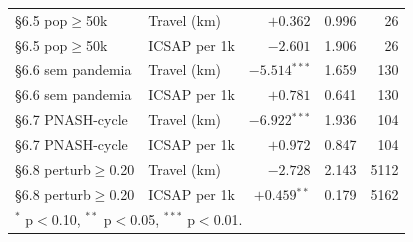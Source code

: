 \begin{table}[h!]
\begin{tabular}{llrrr}
\S6.5 pop$\geq$50k & Travel (km) & $+0.362$ & 0.996 & 26 \\
\S6.5 pop$\geq$50k & ICSAP per 1k & $-2.601$ & 1.906 & 26 \\
\S6.6 sem pandemia & Travel (km) & $-5.514$$^{***}$ & 1.659 & 130 \\
\S6.6 sem pandemia & ICSAP per 1k & $+0.781$ & 0.641 & 130 \\
\S6.7 PNASH-cycle & Travel (km) & $-6.922$$^{***}$ & 1.936 & 104 \\
\S6.7 PNASH-cycle & ICSAP per 1k & $+0.972$ & 0.847 & 104 \\
\S6.8 perturb$\geq$0.20 & Travel (km) & $-2.728$ & 2.143 & 5112 \\
\S6.8 perturb$\geq$0.20 & ICSAP per 1k & $+0.459$$^{**}$ & 0.179 & 5162 \\
\bottomrule
\multicolumn{5}{l}{\footnotesize $^{*}$ p$<$0.10, $^{**}$ p$<$0.05, $^{***}$ p$<$0.01.} \\
\end{tabular}
\end{table}
